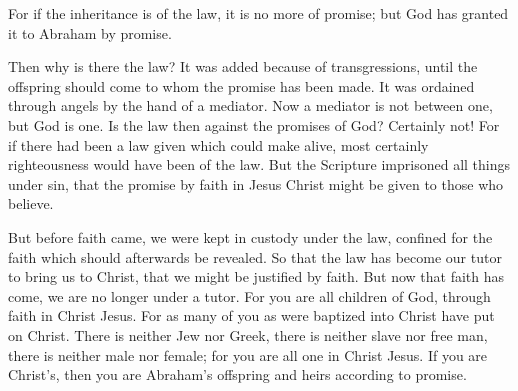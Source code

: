 {For if the inheritance is of the law, it is no more of promise; but God has granted it to Abraham by promise.
\par }{\PP {}Then why is there the law? It was added because of transgressions, until the offspring should come to whom the promise has been made. It was ordained through angels by the hand of a mediator.
Now a mediator is not between one, but God is one.
Is the law then against the promises of God? Certainly not! For if there had been a law given which could make alive, most certainly righteousness would have been of the law.
But the Scripture imprisoned all things under sin, that the promise by faith in Jesus Christ might be given to those who believe.
\par }{\PP {}But before faith came, we were kept in custody under the law, confined for the faith which should afterwards be revealed.
So that the law has become our tutor to bring us to Christ, that we might be justified by faith.
But now that faith has come, we are no longer under a tutor.
For you are all children of God, through faith in Christ Jesus.
For as many of you as were baptized into Christ have put on Christ.
There is neither Jew nor Greek, there is neither slave nor free man, there is neither male nor female; for you are all one in Christ Jesus.
If you are Christ’s, then you are Abraham’s offspring and heirs according to promise.

}
